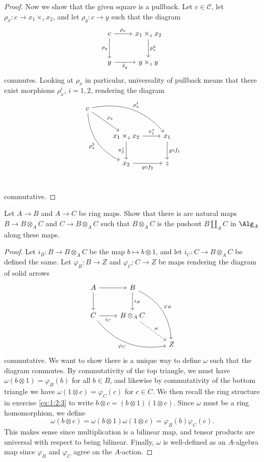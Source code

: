 \begin{proof}
	Now we show that the given square is a pullback. Let $c\in \mathcal{C} $, let $\rho _x : c \to x_1\times _zx_2$, and let $\rho _y : c \to y$ such that the diagram
	\[\begin{tikzcd}[row sep = 2.5em, column sep = 2.5em]
		c \ar[" \rho _x ", r] \ar[" \rho _y "', d]  & x_1\times _zx_2 \ar[" p_x^y ", d]  \\
	y \ar[" \delta _g "', r]  & y\times _zy
	\end{tikzcd}\]
	commutes. Looking at $\rho _x$ in particular, universality of pullback means that there exist morphisms $\rho _x^i$, $i=1,2$, rendering the diagram
	\[\begin{tikzcd}[row sep = 2.5em, column sep = 2.5em]
		c \ar[" \rho _x ", dr] \ar[" \rho _x^1 ", bend left, drr] \ar[" \rho _x^2 "', bend right, ddr]  &  &  \\
	 & x_1\times _zx_2 \ar[" \pi _1^z ", r] \ar[" \pi _2^z "', d]  & x_1\ar[" g\circ f_1 ", d]  \\
	 & x_2 \ar[" g\circ f_2 "', r]  & z \\
	\end{tikzcd}\]
	commutative.
\end{proof}

\begin{exercise}
	Let $A\to B$ and $A\to C$ be ring maps. Show that there is are natural maps $B\to B\otimes _AC$ and $C\to B\otimes _AC$ such that $B\otimes _AC$ is the pushout $B\amalg _AC$ in $\Alg_{A}$ along these maps.
\end{exercise}
\begin{proof}
	Let $i_B : B \to B\otimes _AC$ be the map $b\mapsto b\otimes 1$, and let $i_C : C \to B\otimes _AC$ be defined the same. Let $\varphi _B : B \to Z$ and $\varphi_C : C \to Z$ be maps rendering the diagram of solid arrows
	\[\begin{tikzcd}[row sep = 2.5em, column sep = 2.5em]
	A \ar[r] \ar[d]  & B \ar[" i_B ", d] \ar[" \varphi _B ", bend left, ddr]  &  \\
	C \ar[" i_C "', r] \ar[" \varphi _C "', bend right, drr]  & B\otimes _AC \ar[" \omega ", dashed, dr]  &  \\
	 &  & Z
	\end{tikzcd}\]
	commutative. We want to show there is a unique way to define $\omega $ such that the diagram commutes. By commutativity of the top triangle, we must have $\omega (b\otimes 1) = \varphi _B(b)$ for all $b\in B$, and likewise by commutativity of the bottom triangle we have $\omega (1\otimes c)=\varphi _C(c)$ for $c\in C$. We then recall the ring structure in exercise \ref{ex:1:2:3} to write $b\otimes c = (b\otimes 1)(1\otimes c)$. Since $\omega $ must be a ring homomorphism, we define
	\[
		\omega (b\otimes c) = \omega (b\otimes 1)\omega (1\otimes c) = \varphi _B(b)\varphi _C(c)
	.\]
	This makes sense since multiplication is a bilinear map, and tensor products are universal with respect to being bilinear. Finally, $\omega $ is well-defined as an $A$-algebra map since $\varphi _B$ and $\varphi _C$ agree on the $A$-action.
\end{proof}

